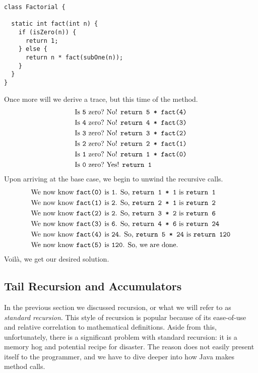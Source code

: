 \begin{lstlisting}[language=MyJava]
class Factorial {

  static int fact(int n) {
    if (isZero(n)) {
      return 1;
    } else {
      return n * fact(subOne(n));
    }
  }
}
\end{lstlisting}
Once more will we derive a trace, but this time of the  method.
\begin{align*}
    \text{Is }\texttt{5} \text{ zero?} &\text{ No! }\texttt{return 5 * fact(4)}\\
    \text{Is }\texttt{4} \text{ zero?} &\text{ No! }\texttt{return 4 * fact(3)}\\
    \text{Is }\texttt{3} \text{ zero?} &\text{ No! }\texttt{return 3 * fact(2)}\\
    \text{Is }\texttt{2} \text{ zero?} &\text{ No! }\texttt{return 2 * fact(1)}\\
    \text{Is }\texttt{1} \text{ zero?} &\text{ No! }\texttt{return 1 * fact(0)}\\
    \text{Is }\texttt{0} \text{ zero?} &\text{ Yes! }\texttt{return 1}
\end{align*}
Upon arriving at the base case, we begin to unwind the recursive calls.
\begin{align*}
    &\text{We now know }\texttt{fact(0)} \text{ is }\texttt{1}\text{. So, } \texttt{return 1 * 1} \text{ is } \texttt{return 1}\\
    &\text{We now know }\texttt{fact(1)} \text{ is }\texttt{2}\text{. So, } \texttt{return 2 * 1} \text{ is } \texttt{return 2}\\
    &\text{We now know }\texttt{fact(2)} \text{ is }\texttt{2}\text{. So, } \texttt{return 3 * 2} \text{ is } \texttt{return 6}\\
    &\text{We now know }\texttt{fact(3)} \text{ is }\texttt{6}\text{. So, } \texttt{return 4 * 6} \text{ is } \texttt{return 24}\\
    &\text{We now know }\texttt{fact(4)} \text{ is }\texttt{24}\text{. So, } \texttt{return 5 * 24} \text{ is } \texttt{return 120}\\
    &\text{We now know }\texttt{fact(5)} \text{ is }\texttt{120}\text{. So, } \text{we are done.} 
\end{align*}
Voil\`a, we get our desired solution.

\subsection{Tail Recursion and Accumulators}
In the previous section we discussed recursion, or what we will refer to as \emph{standard recursion}. This style of recursion is popular because of its ease-of-use and relative correlation to mathematical definitions. Aside from this, unfortunately, there is a significant problem with standard recursion: it is a memory hog and potential recipe for disaster. The reason does not easily present itself to the programmer, and we have to dive deeper into how Java makes method calls.

